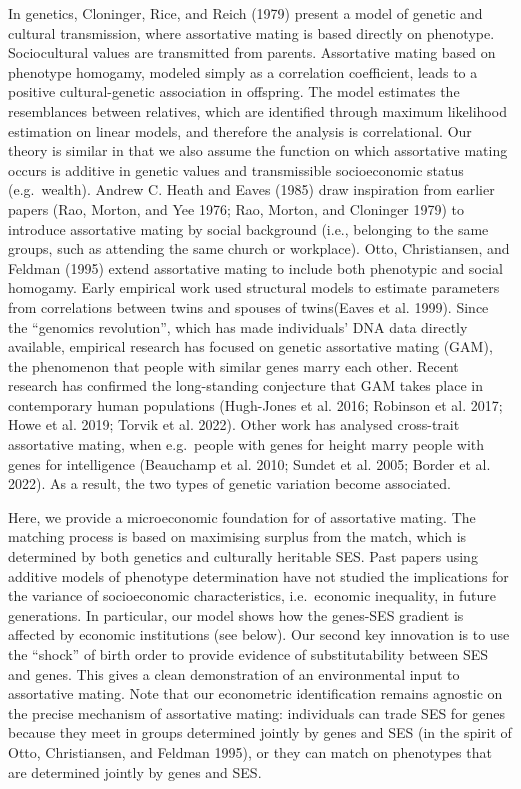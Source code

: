 \documentclass[
  12pt,
]{article}
\theoremstyle{definition}
\theoremstyle{definition}
\theoremstyle{definition}
\theoremstyle{definition}
\theoremstyle{remark}
\begin{document}
In genetics, Cloninger, Rice, and Reich (1979) present a model of genetic and cultural
transmission, where assortative mating is based directly on phenotype.
Sociocultural values are transmitted from parents. Assortative mating based on
phenotype homogamy, modeled simply as a correlation coefficient, leads to a
positive cultural-genetic association in offspring. The model estimates the
resemblances between relatives, which are identified through maximum
likelihood estimation on linear models, and therefore the analysis is
correlational. Our theory is similar in that we also assume the function on
which assortative mating occurs is additive in genetic values and
transmissible socioeconomic status (e.g.~wealth). Andrew C. Heath and Eaves (1985) draw
inspiration from earlier papers (Rao, Morton, and Yee 1976; Rao, Morton, and Cloninger 1979) to introduce
assortative mating by social background (i.e., belonging to the same groups,
such as attending the same church or workplace).
Otto, Christiansen, and Feldman (1995) extend assortative mating to include both phenotypic and social
homogamy. Early empirical work used structural models to estimate parameters from
correlations between twins and spouses of twins(Eaves et al. 1999). Since the
``genomics revolution'', which has made individuals' DNA data directly available,
empirical research has focused on genetic assortative mating (GAM), the
phenomenon that people with similar genes marry each other. Recent research has
confirmed the long-standing conjecture that GAM takes place in contemporary human
populations (Hugh-Jones et al. 2016; Robinson et al. 2017; Howe et al. 2019; Torvik et al. 2022). Other work has analysed cross-trait assortative mating,
when e.g.~people with genes for height marry people with genes for intelligence
(Beauchamp et al. 2010; Sundet et al. 2005; Border et al. 2022). As a result, the two types of
genetic variation become associated.

Here, we provide a microeconomic foundation for of assortative mating. The
matching process is based on maximising surplus from the match, which is
determined by both genetics and culturally heritable SES. Past papers using
additive models of phenotype determination have not studied the implications for
the variance of socioeconomic characteristics, i.e.~economic inequality, in
future generations. In particular, our model shows how
the genes-SES gradient is affected by economic institutions (see below).
Our second key innovation is to use the ``shock'' of birth order to provide
evidence of substitutability between SES and genes. This gives a clean
demonstration of an environmental input to assortative mating.
Note that our econometric identification remains agnostic on the precise
mechanism of assortative mating: individuals can trade SES for genes because they
meet in groups determined jointly by genes and SES (in the spirit of Otto, Christiansen, and Feldman 1995), or they can match on phenotypes that are determined jointly by
genes and SES.
\end{document}

